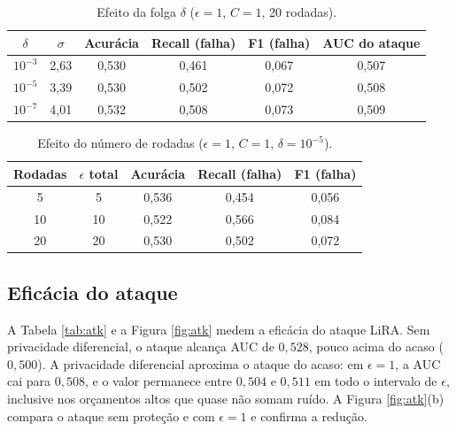 \documentclass[12pt]{article}
\begin{document}
\begin{table}[H]
\centering
\caption{Efeito da folga $\delta$ ($\epsilon=1$, $C=1$, 20 rodadas).}
\label{tab:delta}
\small
\begin{tabular}{cccccc}
\toprule
$\delta$ & $\sigma$ & Acurácia & Recall (falha) & F1 (falha) & AUC do ataque \\
\midrule
$10^{-3}$ & 2,63 & 0,530 & 0,461 & 0,067 & 0,507 \\
$10^{-5}$ & 3,39 & 0,530 & 0,502 & 0,072 & 0,508 \\
$10^{-7}$ & 4,01 & 0,532 & 0,508 & 0,073 & 0,509 \\
\bottomrule
\end{tabular}
\end{table}

\begin{table}[H]
\centering
\caption{Efeito do número de rodadas ($\epsilon=1$, $C=1$, $\delta=10^{-5}$).}
\label{tab:rounds}
\small
\begin{tabular}{ccccc}
\toprule
Rodadas & $\epsilon$ total & Acurácia & Recall (falha) & F1 (falha) \\
\midrule
5  & 5  & 0,536 & 0,454 & 0,056 \\
10 & 10 & 0,522 & 0,566 & 0,084 \\
20 & 20 & 0,530 & 0,502 & 0,072 \\
\bottomrule
\end{tabular}
\end{table}

\subsection{Eficácia do ataque}

A Tabela \ref{tab:atk} e a Figura \ref{fig:atk} medem a eficácia do ataque LiRA. Sem
privacidade diferencial, o ataque alcança AUC de $0{,}528$, pouco acima do acaso
($0{,}500$). A privacidade diferencial aproxima o ataque do acaso: em $\epsilon=1$, a
AUC cai para $0{,}508$, e o valor permanece entre $0{,}504$ e $0{,}511$ em todo o
intervalo de $\epsilon$, inclusive nos orçamentos altos que quase não somam ruído. A
Figura \ref{fig:atk}(b) compara o ataque sem proteção e com $\epsilon=1$ e confirma a
redução.
\end{document}
